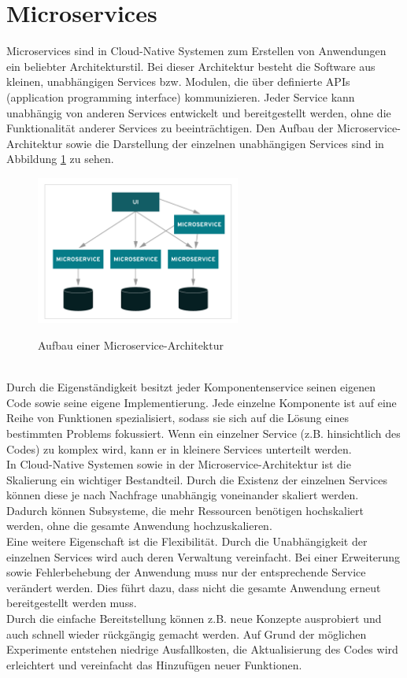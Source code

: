 \section{Microservices}
Microservices sind in Cloud-Native Systemen zum Erstellen von Anwendungen ein beliebter Architekturstil. Bei dieser Architektur besteht die Software aus kleinen, unabhängigen Services bzw. Modulen, die über definierte APIs (application programming interface) kommunizieren. Jeder Service kann unabhängig von anderen Services entwickelt und bereitgestellt werden, ohne die Funktionalität anderer Services zu beeinträchtigen. Den Aufbau der Microservice-Architektur sowie die Darstellung der einzelnen unabhängigen Services sind in Abbildung \ref{micro} zu sehen.\\
\begin{figure}[bth] 
	\centering
	\includegraphics[width=0.6\textwidth]{Graphics/Microservice.png}
	\caption{Aufbau einer Microservice-Architektur}
	\label{micro}
	\cite{microBild}
\end{figure}\\
Durch die Eigenständigkeit besitzt jeder Komponentenservice seinen eigenen Code sowie seine eigene Implementierung. Jede einzelne Komponente ist auf eine Reihe von Funktionen spezialisiert, sodass sie sich auf die Lösung eines bestimmten Problems fokussiert. Wenn ein einzelner Service (z.B. hinsichtlich des Codes) zu komplex wird, kann er in kleinere Services unterteilt werden.\\
In Cloud-Native Systemen sowie in der Microservice-Architektur ist die Skalierung ein wichtiger Bestandteil. Durch die Existenz der einzelnen Services können diese je nach Nachfrage unabhängig voneinander skaliert werden. Dadurch können Subsysteme, die mehr Ressourcen benötigen hochskaliert werden, ohne die gesamte Anwendung hochzuskalieren.\\
Eine weitere Eigenschaft ist die Flexibilität. Durch die Unabhängigkeit der einzelnen Services wird auch deren Verwaltung vereinfacht. Bei einer Erweiterung sowie Fehlerbehebung der Anwendung muss nur der entsprechende Service verändert werden. Dies führt dazu, dass nicht die gesamte Anwendung erneut bereitgestellt werden muss.\\
Durch die einfache Bereitstellung können z.B. neue Konzepte ausprobiert und auch schnell wieder rückgängig gemacht werden. Auf Grund der möglichen Experimente entstehen niedrige Ausfallkosten, die Aktualisierung des Codes wird erleichtert und vereinfacht das Hinzufügen neuer Funktionen.\cite{microservice}

